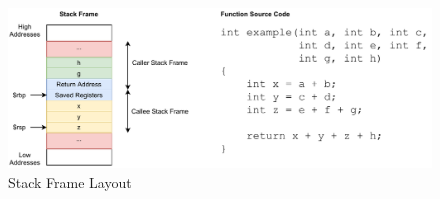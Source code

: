 \begin{figure}[htp!]
\centering
    \includegraphics[width=\textwidth]{assets/figures/chapter2/stack-frame-layout.pdf}
    \caption{Stack Frame Layout}
    \label{fig:stack-frame-layout}
\end{figure}
